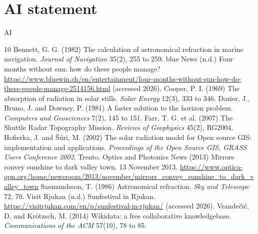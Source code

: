 \documentclass[11pt,a4paper]{article}
\begin{document}
\section*{AI statement}
{{AI}}

\begin{thebibliography}{10}
 Bennett, G. G. (1982) The calculation of astronomical refraction in marine navigation. \textit{Journal of Navigation} 35(2), 255 to 259.
 blue News (n.d.) Four months without sun: how do these people manage? \url{https://www.bluewin.ch/en/entertainment/four-months-without-sun-how-do-these-people-manage-2514156.html} (accessed 2026).
 Cooper, P. I. (1969) The absorption of radiation in solar stills. \textit{Solar Energy} 12(3), 333 to 346.
 Dozier, J., Bruno, J. and Downey, P. (1981) A faster solution to the horizon problem. \textit{Computers and Geosciences} 7(2), 145 to 151.
 Farr, T. G. et al. (2007) The Shuttle Radar Topography Mission. \textit{Reviews of Geophysics} 45(2), RG2004.
 Hofierka, J. and \v{S}\'uri, M. (2002) The solar radiation model for Open source GIS: implementation and applications. \textit{Proceedings of the Open Source GIS, GRASS Users Conference 2002}, Trento.
 Optics and Photonics News (2013) Mirrors convey sunshine to dark valley town. 13 November 2013. \url{https://www.optica-opn.org/home/newsroom/2013/november/mirrors_convey_sunshine_to_dark_valley_town}
 Saemundsson, T. (1986) Astronomical refraction. \textit{Sky and Telescope} 72, 70.
 Visit Rjukan (n.d.) Sunfestival in Rjukan. \url{https://visitrjukan.com/en/p/sunfestival-in-rjukan/} (accessed 2026).
 Vrande\v{c}i\'c, D. and Kr\"otzsch, M. (2014) Wikidata: a free collaborative knowledgebase. \textit{Communications of the ACM} 57(10), 78 to 85.
\end{thebibliography}
\end{document}
